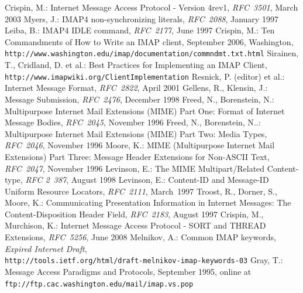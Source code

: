 \documentclass[12pt,notitlepage]{report}
\begin{document}
\begin{thebibliography}{99}
    Crispin, M.: Internet Message Access Protocol - Version
        4rev1, {\em RFC~3501}, March 2003
    Myers, J.: IMAP4 non-synchronizing literals, {\em
        RFC~2088}, January 1997
    Leiba, B.: IMAP4 IDLE command, {\em RFC~2177}, June 1997
    Crispin, M.: Ten Commandments of How to
        Write an IMAP client, September 2006, Washington,\\
        {\tt http://www.washington.edu/imap/documentation/commndmt.txt.html}
    Sirainen, T., Cridland, D. et al.: Best
        Practices for Implementing an IMAP Client, {\tt
        http://www.imapwiki.org/ClientImplementation}
    Resnick, P. (editor) et al.: Internet Message Format, {\em
        RFC~2822}, April 2001
    Gellens, R., Klensin, J.: Message Submission, {\em
        RFC~2476}, December 1998
    Freed, N., Borenstein, N.: Multipurpose Internet
        Mail Extensions (MIME) Part One: Format of Internet Message Bodies, {\em
        RFC~2045}, November 1996
    Freed, N., Borenstein, N..: Multipurpose Internet
        Mail Extensions (MIME) Part Two: Media Types, {\em RFC~2046}, November
        1996
    Moore, K.: MIME (Multipurpose Internet Mail Extensions)
        Part Three: Message Header Extensions for Non-ASCII Text, {\em RFC~2047},
        November 1996
    Levinson, E.: The MIME Multipart/Related
        Content-type, {\em RFC 2~387}, August 1998
    Levinson, E.: Content-ID and Message-ID Uniform
        Resource Locators, {\em RFC~2111}, March~1997
    Troost, R., Dorner, S., Moore, K.:
        Communicating Presentation Information in Internet Messages: The
        Content-Disposition Header Field, {\em RFC~2183}, August 1997
    Crispin, M., Murchison, K.: Internet Message Access
        Protocol - SORT and THREAD Extensions, {\em RFC~5256}, June 2008
    Melnikov, A.: Common IMAP keywords, {\em
        Expired Internet Draft}, \\
        {\tt http://tools.ietf.org/html/draft-melnikov-imap-keywords-03}
    Gray, T.: Message Access Paradigms and Protocols,
        September 1995, online at {\tt
        ftp://ftp.cac.washington.edu/mail/imap.vs.pop}

\end{thebibliography}
\end{document}
